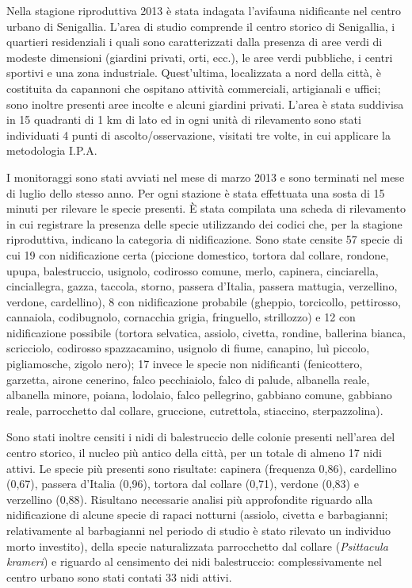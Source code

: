Nella stagione riproduttiva 2013 \`e stata
indagata l'avifauna nidificante nel centro urbano di
Senigallia. L'area di studio comprende il centro
storico di Senigallia, i quartieri residenziali i quali sono
caratterizzati dalla presenza di aree verdi di modeste dimensioni
(giardini privati, orti, ecc.), le aree verdi pubbliche, i centri
sportivi e una zona industriale. Quest'ultima,
localizzata a nord della citt\`a, \`e costituita da capannoni che
ospitano attivit\`a commerciali, artigianali e uffici; sono inoltre
presenti aree incolte e alcuni giardini privati.
L'area \`e stata suddivisa in 15 quadranti di 1 km di lato ed in ogni unit\`a di rilevamento sono stati individuati 4 punti di ascolto/osservazione, visitati tre volte, in cui applicare la
metodologia I.P.A. 

I monitoraggi sono stati avviati nel mese di marzo
2013 e sono terminati nel mese di luglio dello stesso anno. Per ogni
stazione \`e stata effettuata una sosta di 15 minuti per rilevare le
specie presenti. \`E stata compilata una scheda di rilevamento in cui
registrare la presenza delle specie utilizzando dei codici che, per la
stagione riproduttiva, indicano la categoria di nidificazione. Sono
state censite 57 specie di cui 19 con nidificazione certa (piccione
domestico, tortora dal collare, rondone, upupa, balestruccio, usignolo,
codirosso comune, merlo, capinera, cinciarella, cinciallegra, gazza,
taccola, storno, passera d'Italia, passera mattugia,
verzellino, verdone, cardellino), 8 con nidificazione probabile
(gheppio, torcicollo, pettirosso, cannaiola, codibugnolo, cornacchia
grigia, fringuello, strillozzo) e 12 con nidificazione possibile
(tortora selvatica, assiolo, civetta, rondine, ballerina bianca,
scricciolo, codirosso spazzacamino, usignolo di fiume, canapino, lu\`i
piccolo, pigliamosche, zigolo nero); 17 invece le specie non
nidificanti (fenicottero, garzetta, airone cenerino, falco pecchiaiolo,
falco di palude, albanella reale, albanella minore, poiana, lodolaio,
falco pellegrino, gabbiano comune, gabbiano reale, parrocchetto dal
collare, gruccione, cutrettola, stiaccino, sterpazzolina). 

Sono stati
inoltre censiti i nidi di balestruccio delle colonie presenti
nell'area del centro storico, il nucleo pi\`u antico
della citt\`a, per un totale di almeno 17 nidi attivi. Le specie pi\`u
presenti sono risultate: capinera (frequenza 0,86), cardellino (0,67),
passera d'Italia (0,96), tortora dal collare (0,71),
verdone (0,83) e verzellino (0,88). Risultano necessarie analisi pi\`u
approfondite riguardo alla nidificazione di alcune specie di rapaci
notturni (assiolo, civetta e barbagianni; relativamente al barbagianni
nel periodo di studio \`e stato rilevato un individuo morto investito),
della specie naturalizzata parrocchetto dal collare (\textit{Psittacula
krameri}) e riguardo al censimento dei nidi balestruccio:
complessivamente nel centro urbano sono stati contati 33 nidi attivi.

